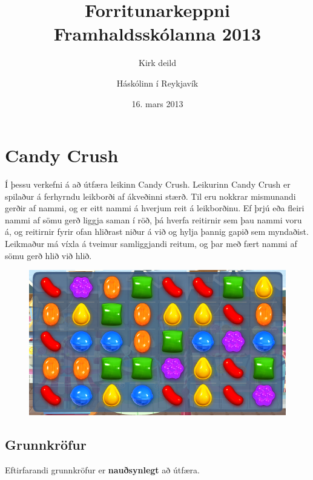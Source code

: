 \documentclass[11pt,a4paper,oneside]{article}
\title{Forritunarkeppni Framhaldsskólanna 2013}
\subtitle{Kirk deild}
\date{16. mars 2013}
\author{Háskólinn í Reykjavík}
\begin{document}
	\maketitle
	\thispagestyle{empty}
	\pagebreak

	\section*{Candy Crush}

	Í þessu verkefni á að útfæra leikinn Candy Crush. Leikurinn Candy Crush er spilaður á ferhyrndu leikborði af ákveðinni stærð. Til eru nokkrar mismunandi gerðir af nammi, og er eitt nammi á hverjum reit á leikborðinu. Ef þrjú eða fleiri nammi af sömu gerð liggja saman í röð, þá hverfa reitirnir sem þau nammi voru á, og reitirnir fyrir ofan hliðrast niður á við og hylja þannig gapið sem myndaðist. Leikmaður má víxla á tveimur samliggjandi reitum, og þar með fært nammi af sömu gerð hlið við hlið.

	\begin{figure}[h]
		\centering
		\includegraphics[scale=0.8]{candycrush.png}
	\end{figure}

	\subsection*{Grunnkröfur}
	Eftirfarandi grunnkröfur er \textbf{nauðsynlegt} að útfæra.
\end{document}
